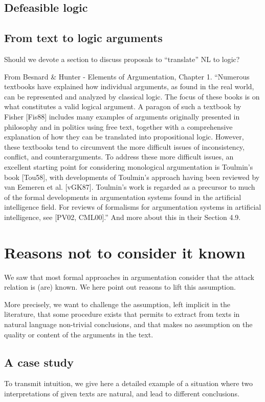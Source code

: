 \documentclass[version=3.21, pagesize, twoside=off, bibliography=totoc, DIV=calc, fontsize=12pt, a4paper, french, english]{scrartcl}
\begin{document}
\subsection{Defeasible logic}

\subsection{From text to logic arguments}
Should we devote a section to discuss proposals to “translate” NL to logic?

From Besnard \& Hunter - Elements of Argumentation, Chapter 1. “Numerous textbooks have explained how individual arguments, as found in the real world, can be represented and analyzed by classical logic. The focus of these books is on what constitutes a valid logical argument. A paragon of such a textbook by Fisher [Fis88] includes many examples of arguments originally presented in philosophy and in politics using free text, together with a comprehensive explanation of how they can be translated into propositional logic. However, these textbooks tend to circumvent the more difficult issues of inconsistency, conflict, and counterarguments.
To address these more difficult issues, an excellent starting point for considering monological argumentation is Toulmin’s book [Tou58], with developments of Toulmin’s approach having been reviewed by van Eemeren et al. [vGK87]. Toulmin’s work is regarded as a precursor to much of the formal developments in argumentation systems found in the artificial intelligence field. For reviews of formalisms for argumentation systems in artificial intelligence, see [PV02, CML00].” And more about this in their Section 4.9.

\section{Reasons not to consider it known}
We saw that most formal approaches in argumentation consider that the attack relation is (are) known. 
We here point out reasons to lift this assumption.

More precisely, we want to challenge the assumption, left implicit in the literature, that some procedure exists that permits to extract from texts in natural language non-trivial conclusions, and that makes no assumption on the quality or content of the arguments in the text.

\subsection{A case study}
To transmit intuition, we give here a detailed example of a situation where two interpretations of given texts are natural, and lead to different conclusions.
\end{document}
